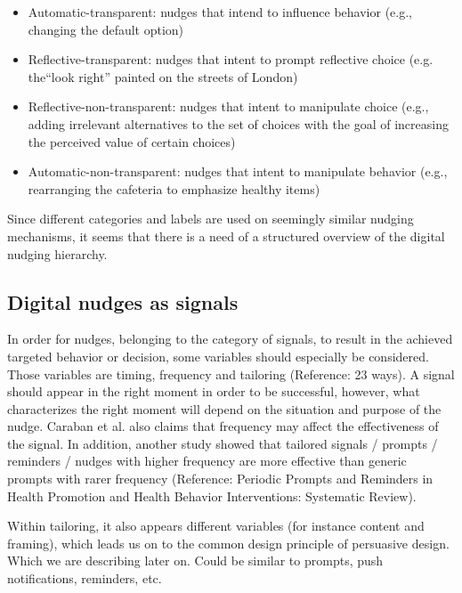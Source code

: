 \begin{itemize}
\item Automatic-transparent: nudges that intend to influence behavior (e.g., changing the default option)
\item Reflective-transparent: nudges that intent to prompt reflective choice (e.g. the“look right” painted on the streets of London)
\item Reflective-non-transparent: nudges that intent to manipulate choice (e.g., adding irrelevant alternatives to the set of choices with the goal of increasing the perceived value of certain choices)
\item Automatic-non-transparent: nudges that intent to manipulate behavior (e.g., rearranging the cafeteria to emphasize healthy items)
\end{itemize}

Since different categories and labels are used on seemingly similar nudging mechanisms, it seems that there is a need of a structured overview of the digital nudging hierarchy. 

\subsection{Digital nudges as signals}
In order for nudges, belonging to the category of signals, to result in the achieved targeted  behavior or decision, some variables should especially be considered. Those variables are timing, frequency and tailoring (Reference: 23 ways). A signal should appear in the right moment in order to be successful, however, what characterizes the right moment will depend on the situation and purpose of the nudge. Caraban et al. also claims that frequency may affect the effectiveness of the signal. In addition, another study showed that tailored signals / prompts / reminders / nudges with higher frequency are more effective than generic prompts with rarer frequency (Reference: Periodic Prompts and Reminders in Health Promotion and Health Behavior Interventions: Systematic Review). 

Within tailoring, it also appears different variables (for instance content and framing), which leads us on to the common design principle of persuasive design. Which we are describing later on.  
Could be similar to prompts, push notifications, reminders, etc. 


